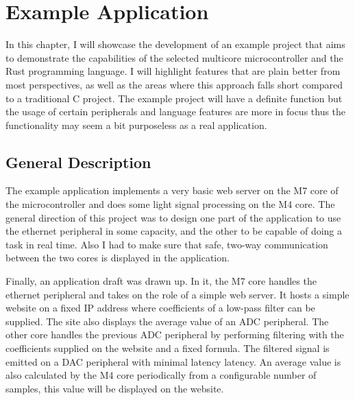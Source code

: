 
\chapter{Example Application}

In this chapter, I will showcase the development of an example project that aims to demonstrate the capabilities of the selected multicore microcontroller and the Rust programming language. I will highlight features that are plain better from most perspectives, as well as the areas where this approach falls short compared to a traditional C project. The example project will have a definite function but the usage of certain peripherals and language features are more in focus thus the functionality may seem a bit purposeless as a real application.

\section{General Description}

The example application implements a very basic web server on the M7 core of the microcontroller and does some light signal processing on the M4 core. The general direction of this project was to design one part of the application to use the ethernet peripheral in some capacity, and the other to be capable of doing a task in real time. Also I had to make sure that safe, two-way communication between the two cores is displayed in the application.

Finally, an application draft was drawn up. In it, the M7 core handles the ethernet peripheral and takes on the role of a simple web server. It hosts a simple website on a fixed IP address where coefficients of a low-pass filter can be supplied. The site also displays the average value of an ADC peripheral. The other core handles the previous ADC peripheral by performing filtering with the coefficients supplied on the website and a fixed formula. The filtered signal is emitted on a DAC peripheral with minimal latency latency. An average value is also calculated by the M4 core periodically from a configurable number of samples, this value will be displayed on the website.

